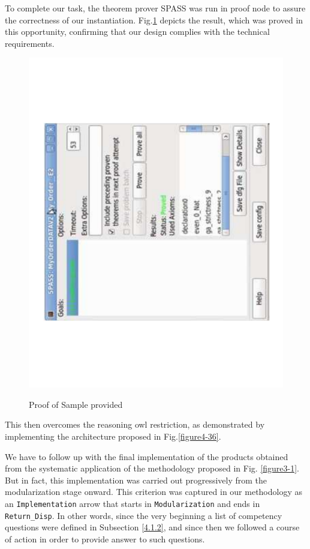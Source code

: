 To complete our task, the theorem prover SPASS \cite{weidenbach_chapter_2001} was run in proof node to assure the correctness of our instantiation. Fig.\ref{figure4-40} depicts the result, which was proved in this opportunity, confirming that our design complies with the technical requirements.



\begin{figure}
\begin{center}
	\includegraphics[scale=0.5, angle=-90]{figure-chapterIV/fig4-40.pdf}\\
	\caption{Proof of Sample provided}
	\label{figure4-40}
\end{center}
\end{figure}

This then overcomes the reasoning \gls{owl} restriction, as demonstrated by implementing the architecture proposed in Fig.\ref{figure4-36}.

We have to follow up with the final implementation of the products obtained from the systematic application of the methodology proposed in Fig. \ref{figure3-1}. But in fact, this implementation was carried out progressively from the modularization stage onward. This criterion was captured in our methodology as an \texttt{Implementation} arrow that starts in \texttt{Modularization} and ends in \texttt{Return\_Disp}. In other words, since the very beginning a list of competency questions were defined in Subsection \ref{4.1.2}, and since then we followed a course of action in order to provide answer to such questions. 


